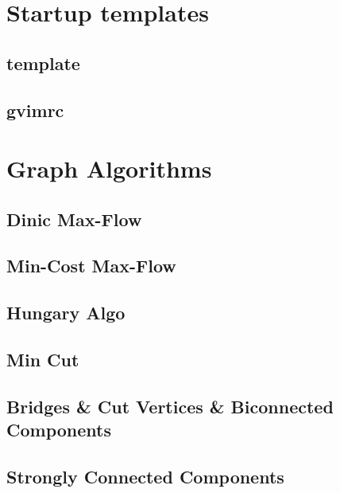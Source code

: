 \documentclass[10pt]{article}
\begin{document}
\tableofcontents



\newpage
\section{Startup templates}
\subsection{template}

\subsection{gvimrc}




\newpage
\section{Graph Algorithms}
%
\subsection{Dinic Max-Flow}

\subsection{Min-Cost Max-Flow}

\subsection{Hungary Algo}

\subsection{Min Cut}

\subsection{Bridges \& Cut Vertices \& Biconnected Components}

\subsection{Strongly Connected Components}

\end{document}

